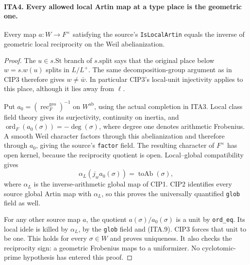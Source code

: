 \paragraph{ITA4. Every allowed local Artin map at a type place is the geometric one.}
\label{claim:ITA4}
Every map $a:W\to F^\times$ satisfying the source's
\texttt{IsLocalArtin} equals the inverse of geometric local
reciprocity on the Weil abelianization.
\begin{proof}
The $u\in s.\mathrm{St}$ branch of $s.\mathrm{split}$
says that the original place below $w=s.w(u)$ splits in
$L/L^+$.  The same decomposition-group argument as in
CIP3 therefore gives $w\ne\bar w$.  In particular CIP3's
local-unit injectivity applies to this place, although
it lies away from $\ell$.

Put $a_0=(\operatorname{rec}^{\mathrm{geo}}_F)^{-1}$ on
$W^{\mathrm{ab}}$, using the actual completion in ITA3.
Local class field theory gives its surjectivity, continuity
on inertia, and
$\operatorname{ord}_F(a_0(\sigma))=-\deg(\sigma)$,
where degree one denotes arithmetic Frobenius.  A smooth
Weil character factors through this abelianization and
therefore through $a_0$, giving the source's \texttt{factor}
field.  The resulting character of $F^\times$ has open
kernel, because the reciprocity quotient is open.
Local--global compatibility gives
\[
       \alpha_L(j_w a_0(\sigma))=\operatorname{toAb}(\sigma),
                                                               \tag{ITA.9}
\]
where $\alpha_L$ is the inverse-arithmetic global map of
CIP1.  CIP2 identifies every source global Artin map with
$\alpha_L$, so this proves the universally quantified
\texttt{glob} field as well.

For any other source map $a$, the quotient
$a(\sigma)/a_0(\sigma)$ is a unit by \texttt{ord\_eq}.
Its local idele is killed by $\alpha_L$, by the
\texttt{glob} field and (ITA.9).  CIP3 forces that unit
to be one.  This holds for every $\sigma\in W$ and
proves uniqueness.  It also checks the reciprocity sign:
a geometric Frobenius maps to a uniformizer.  No
cyclotomic-prime hypothesis has entered this proof.
\end{proof}

